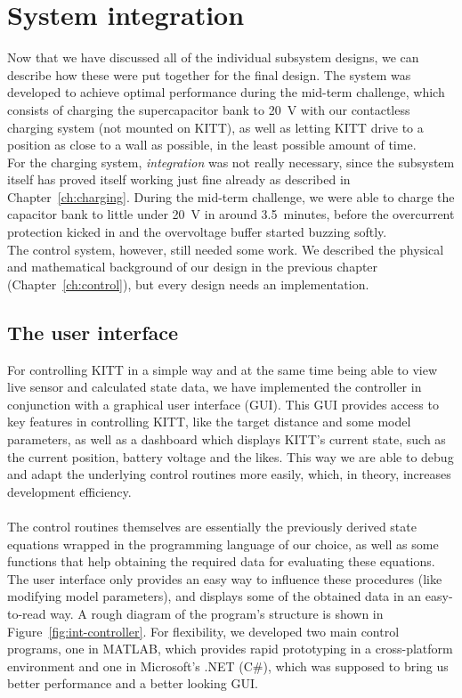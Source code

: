 \documentclass[11pt,titlepage]{report}
\begin{document}
\chapter{System integration}
\label{ch:integration}
Now that we have discussed all of the individual subsystem designs, we can describe how these were put together for the final design. The system was developed to achieve optimal performance during the mid-term challenge, which consists of charging the supercapacitor bank to \SI{20}{V} with our contactless charging system (not mounted on KITT), as well as letting KITT drive to a position as close to a wall as possible, in the least possible amount of time. \\
For the charging system, \textit{integration} was not really necessary, since the subsystem itself has proved itself working just fine already as described in Chapter~\ref{ch:charging}. During the mid-term challenge, we were able to charge the capacitor bank to little under \SI{20}{V} in around \SI{3.5}{minutes}, before the overcurrent protection kicked in and the overvoltage buffer started buzzing softly.
\\
The control system, however, still needed some work. We described the physical and mathematical background of our design in the previous chapter (Chapter~\ref{ch:control}), but every design needs an implementation.

\section{The user interface}
For controlling KITT in a simple way and at the same time being able to view live sensor and calculated state data, we have implemented the controller in conjunction with a graphical user interface (GUI). This GUI provides access to key features in controlling KITT, like the target distance and some model parameters, as well as a dashboard which displays KITT's current state, such as the current position, battery voltage and the likes. This way we are able to debug and adapt the underlying control routines more easily, which, in theory, increases development efficiency.
\\\\
The control routines themselves are essentially the previously derived state equations wrapped in the programming language of our choice, as well as some functions that help obtaining the required data for evaluating these equations. The user interface only provides an easy way to influence these procedures (like modifying model parameters), and displays some of the obtained data in an easy-to-read way. A rough diagram of the program's structure is shown in Figure~\ref{fig:int-controller}. For flexibility, we developed two main control programs, one in MATLAB, which provides rapid prototyping in a cross-platform environment and one in Microsoft's .NET (C\#), which was supposed to bring us better performance and a better looking GUI.
\end{document}
